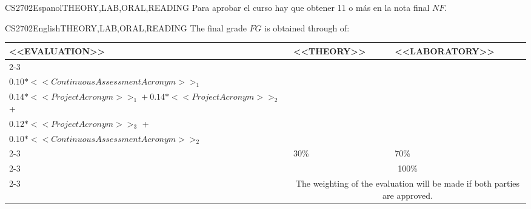 \begin{evaluation}{CS2702}{Espanol}{THEORY,LAB,ORAL,READING}
  \noindent Para aprobar el curso hay que obtener 11 o más en la nota final $NF$.
  \end{evaluation}
 
  \begin{evaluation}{CS2702}{English}{THEORY,LAB,ORAL,READING}
  The final grade $FG$ is obtained through of:
  
  \begin{tabularx}{0.9\textwidth}{|X|p{}|p{}|} \hline
    \multirow{4}{*}{\uppercase{<<Evaluation>>}} & \uppercase{<<Theory>>} & \uppercase{<<Laboratory>>} \\ \cline{2-3}
    & %
        \begin{minipage}{0.95\textwidth}
        \begin{tabular}{l}
            $0.10*<<PracticalTestAcronym>>_{1} + 0.10*<<PracticalTestAcronym>>_{2}$ + \\  
            $0.10*<<ContinuousAssessmentAcronym>>_{1}$
        \end{tabular} 
        \end{minipage} 
    & %
        \begin{minipage}{0.95\textwidth}
        \begin{tabular}{l}
            $0.10*<<PracticalTestAcronym>>_{3} + 0.10*<<PracticalTestAcronym>>_{4}$ + \\ 
            $0.14*<<ProjectAcronym>>_{1} + 0.14*<<ProjectAcronym>>_{2}$  +\\
            $0.12*<<ProjectAcronym>>_{3}$ +\\
            $0.10*<<ContinuousAssessmentAcronym>>_{2}$
            \end{tabular} 
        \end{minipage}                 \\ \cline{2-3}
    
    & %
    30\% 
    & %
    70\% \\ \cline{2-3}
    & \multicolumn{2}{|c|}{100\%}  \\ \cline{2-3}
    & \multicolumn{2}{|c|}{The weighting of the evaluation will be made if both parties are approved.}  \\ \hline
    \end{tabularx}
    

\end{evaluation}
